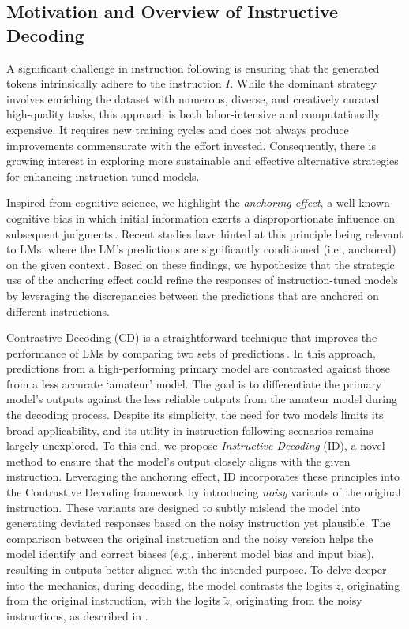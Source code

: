 \vspace{-5pt}
\subsection{Motivation and Overview of Instructive Decoding}
\vspace{-5pt}

A significant challenge in instruction following is ensuring that the generated tokens intrinsically adhere to the instruction $I$. While the dominant strategy involves enriching the dataset with numerous, diverse, and creatively curated high-quality tasks, this approach is both labor-intensive and computationally expensive. It requires new training cycles and does not always produce improvements commensurate with the effort invested. Consequently, there is growing interest in exploring more sustainable and effective alternative strategies for enhancing instruction-tuned models.

Inspired from cognitive science, we highlight the \textit{anchoring effect}, a well-known cognitive bias in which initial information exerts a disproportionate influence on subsequent judgments\,\citep{kahneman1982judgment}. Recent studies have hinted at this principle being relevant to LMs, where the LM's predictions are significantly conditioned (i.e., anchored) on the given context\,\citep{jones2022capturing, coherence_boosting}. Based on these findings, we hypothesize that the strategic use of the anchoring effect could refine the responses of instruction-tuned models by leveraging the discrepancies between the predictions that are anchored on different instructions.

Contrastive Decoding (CD) is a straightforward technique that improves the performance of LMs by comparing two sets of predictions\,\citep{contrastive_decoding, dexperts}. In this approach, predictions from a high-performing primary model are contrasted against those from a less accurate `amateur' model. The goal is to differentiate the primary model's outputs against the less reliable outputs from the amateur model during the decoding process. Despite its simplicity, the need for two models limits its broad applicability, and its utility in instruction-following scenarios remains largely unexplored.
To this end, we propose \textit{Instructive Decoding} (ID), a novel method to ensure that the model's output closely aligns with the given instruction. Leveraging the anchoring effect, ID incorporates these principles into the Contrastive Decoding framework by introducing \textit{noisy} variants of the original instruction. These variants are designed to subtly mislead the model into generating deviated responses based on the noisy instruction yet plausible. The comparison between the original instruction and the noisy version helps the model identify and correct biases (e.g., inherent model bias and input bias), resulting in outputs better aligned with the intended purpose. To delve deeper into the mechanics, during decoding, the model contrasts the logits \(z\), originating from the original instruction, with the logits \(\tilde{z}\), originating from the noisy instructions, as described in .


